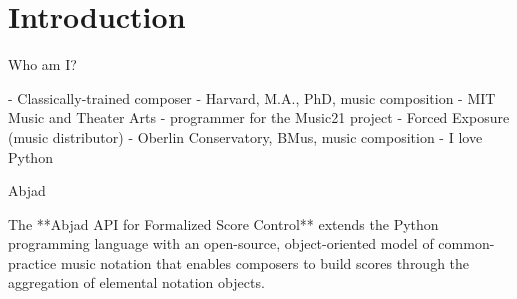 \section{Introduction}

\begin{frame}[fragile]{Who am I?}
\begin{markdown}
- Classically-trained composer
- Harvard, M.A., PhD, music composition
- MIT Music and Theater Arts 
    - programmer for the Music21 project
- Forced Exposure (music distributor)
- Oberlin Conservatory, BMus, music composition
- I love Python
\end{markdown}
\end{frame}

\begin{frame}[fragile]{Abjad}
\begin{markdown}
The **Abjad API for Formalized Score Control** extends the Python
programming language with an open-source, object-oriented model of
common-practice music notation that enables composers to build scores
through the aggregation of elemental notation objects.
\end{markdown}
\end{frame}
